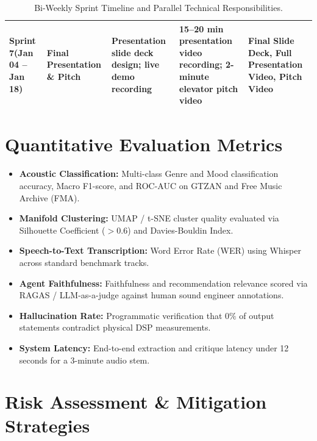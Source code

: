 \documentclass[11pt,a4paper]{article}
\begin{document}
\begin{table}[htbp]
\begin{tabularx}{\textwidth}{p{1.8cm} p{2.2cm} X X p{2.4cm}}
\midrule
\textbf{Sprint 7}\newline(Jan 04 -- Jan 18) & Final Presentation \& Pitch & Presentation slide deck design; live demo recording & 15--20 min presentation video recording; 2-minute elevator pitch video & Final Slide Deck, Full Presentation Video, Pitch Video \\
\bottomrule
\end{tabularx}
\caption{Bi-Weekly Sprint Timeline and Parallel Technical Responsibilities.}
\label{tab:sprints}
\end{table}

\section{Quantitative Evaluation Metrics}

\begin{itemize}
    \item \textbf{Acoustic Classification:} Multi-class Genre and Mood classification accuracy, Macro F1-score, and ROC-AUC on GTZAN and Free Music Archive (FMA).
    \item \textbf{Manifold Clustering:} UMAP / t-SNE cluster quality evaluated via Silhouette Coefficient ($> 0.6$) and Davies-Bouldin Index.
    \item \textbf{Speech-to-Text Transcription:} Word Error Rate (WER) using Whisper across standard benchmark tracks.
    \item \textbf{Agent Faithfulness:} Faithfulness and recommendation relevance scored via RAGAS / LLM-as-a-judge against human sound engineer annotations.
    \item \textbf{Hallucination Rate:} Programmatic verification that $0\%$ of output statements contradict physical DSP measurements.
    \item \textbf{System Latency:} End-to-end extraction and critique latency under 12 seconds for a 3-minute audio stem.
\end{itemize}

\section{Risk Assessment \& Mitigation Strategies}
\end{document}
